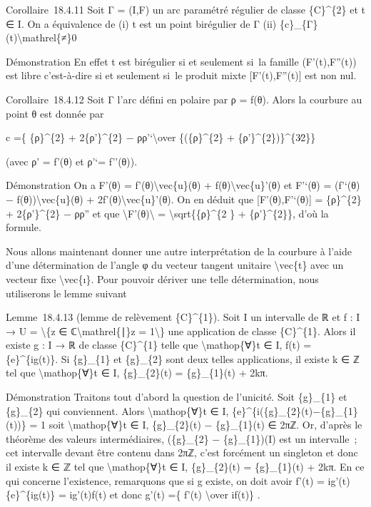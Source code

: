 \documentclass[]{article}
\begin{document}
Corollaire~18.4.11 Soit Γ = (I,F) un arc paramétré régulier de classe
\{C\}\^{}\{2\} et t ∈ I. On a équivalence de (i) t est un point
birégulier de Γ (ii) \{c\}\_\{Γ\}(t)\textbackslash{}mathrel\{≠\}0

Démonstration En effet t est birégulier si et seulement si~la famille
(F'(t),F''(t)) est libre c'est-à-dire si et seulement si~le produit
mixte {[}F'(t),F''(t){]} est non nul.

Corollaire~18.4.12 Soit Γ l'arc défini en polaire par ρ = f(θ). Alors la
courbure au point θ est donnée par

c =\{ \{ρ\}\^{}\{2\} + 2\{ρ'\}\^{}\{2\} − ρρ'`\textbackslash{}over
\{(\{ρ\}\^{}\{2\} + \{ρ'\}\^{}\{2\})\}\^{}\{3∕2\}\}

(avec ρ' = f'(θ) et ρ'`= f''(θ)).

Démonstration On a F'(θ) = f'(θ)\textbackslash{}vec\{u\}(θ) +
f(θ)\textbackslash{}vec\{u\}'(θ) et F'`(θ) = (f'`(θ) −
f(θ))\textbackslash{}vec\{u\}(θ) + 2f'(θ)\textbackslash{}vec\{u\}'(θ).
On en déduit que {[}F'(θ),F'`(θ){]} = \{ρ\}\^{}\{2\} + 2\{ρ'\}\^{}\{2\}
− ρρ'' et que \textbackslash{}\textbar{}F'(θ)\textbackslash{}\textbar{}
= \textbackslash{}sqrt\{\{ρ\}\^{}\{2 \} + \{ρ'\}\^{}\{2\}\}, d'où la
formule.

Nous allons maintenant donner une autre interprétation de la courbure à
l'aide d'une détermination de l'angle φ du vecteur tangent unitaire
\textbackslash{}vec\{t\} avec un vecteur fixe \textbackslash{}vec\{ı\}.
Pour pouvoir dériver une telle détermination, nous utiliserons le lemme
suivant

Lemme~18.4.13 (lemme de relèvement \{C\}\^{}\{1\}). Soit I un intervalle
de ℝ et f : I → U = \textbackslash{}\{z ∈
ℂ\textbackslash{}mathrel\{∣\}\textbar{}z\textbar{} = 1\textbackslash{}\}
une application de classe \{C\}\^{}\{1\}. Alors il existe g : I → ℝ de
classe \{C\}\^{}\{1\} telle que \textbackslash{}mathop\{∀\}t ∈ I, f(t) =
\{e\}\^{}\{ig(t)\}. Si \{g\}\_\{1\} et \{g\}\_\{2\} sont deux telles
applications, il existe k ∈ ℤ tel que \textbackslash{}mathop\{∀\}t ∈ I,
\{g\}\_\{2\}(t) = \{g\}\_\{1\}(t) + 2kπ.

Démonstration Traitons tout d'abord la question de l'unicité. Soit
\{g\}\_\{1\} et \{g\}\_\{2\} qui conviennent. Alors
\textbackslash{}mathop\{∀\}t ∈ I,
\{e\}\^{}\{i(\{g\}\_\{2\}(t)−\{g\}\_\{1\}(t))\} = 1 soit
\textbackslash{}mathop\{∀\}t ∈ I, \{g\}\_\{2\}(t) − \{g\}\_\{1\}(t) ∈
2πℤ. Or, d'après le théorème des valeurs intermédiaires, (\{g\}\_\{2\} −
\{g\}\_\{1\})(I) est un intervalle~; cet intervalle devant être contenu
dans 2πℤ, c'est forcément un singleton et donc il existe k ∈ ℤ tel que
\textbackslash{}mathop\{∀\}t ∈ I, \{g\}\_\{2\}(t) = \{g\}\_\{1\}(t) +
2kπ. En ce qui concerne l'existence, remarquons que si g existe, on doit
avoir f'(t) = ig'(t)\{e\}\^{}\{ig(t)\} = ig'(t)f(t) et donc g'(t) =\{
f'(t) \textbackslash{}over if(t)\} .
\end{document}
